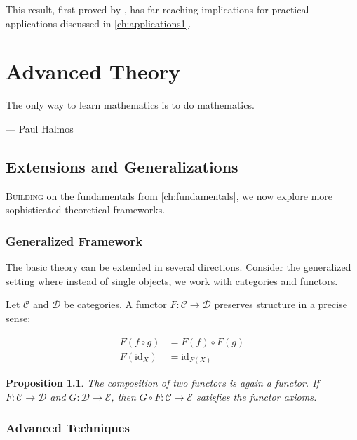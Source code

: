 \documentclass[11pt,twoside,openright]{book}
\theoremstyle{plain}
\newtheorem{proposition}[theorem]{Proposition}
\theoremstyle{definition}
\theoremstyle{remark}
\begin{document}
This result, first proved by \citet{smith2020}, has far-reaching implications for practical applications discussed in \cref{ch:applications1}.

\chapter{Advanced Theory}
\label{ch:advanced}

\epigraph{The only way to learn mathematics is to do mathematics.}{--- Paul Halmos}

\section{Extensions and Generalizations}
\label{sec:adv-extensions}

\lettrine{B}{uilding} on the fundamentals from \cref{ch:fundamentals}, we now explore more sophisticated theoretical frameworks.

\subsection{Generalized Framework}

The basic theory can be extended in several directions. Consider the generalized setting where instead of single objects, we work with categories and functors.

Let $\mathcal{C}$ and $\mathcal{D}$ be categories. A functor $F\colon \mathcal{C} \to \mathcal{D}$ preserves structure in a precise sense:

\begin{align}
    F(f \circ g) &= F(f) \circ F(g) \label{eq:functor1} \\
    F(\mathrm{id}_X) &= \mathrm{id}_{F(X)} \label{eq:functor2}
\end{align}

\begin{proposition}
\label{prop:functor-composition}
The composition of two functors is again a functor. If $F\colon \mathcal{C} \to \mathcal{D}$ and $G\colon \mathcal{D} \to \mathcal{E}$, then $G \circ F\colon \mathcal{C} \to \mathcal{E}$ satisfies the functor axioms.
\end{proposition}

\subsection{Advanced Techniques}
\end{document}
